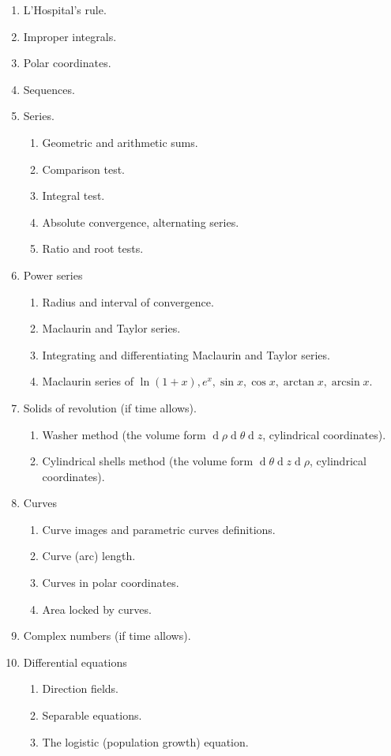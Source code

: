 \documentclass{article}
\begin{document}
\begin{enumerate}
\begin{enumerate}
\end{enumerate}
\item L'Hospital's rule.
\item Improper integrals.
\item Polar coordinates.
\item Sequences.
\item Series.
\begin{enumerate}
\item Geometric and arithmetic sums.
\item Comparison test.
\item Integral test.
\item Absolute convergence, alternating series.
\item Ratio and root tests.
\end{enumerate}
\item Power series
\begin{enumerate}
\item Radius and interval of convergence.
\item Maclaurin and Taylor series.
\item Integrating and differentiating Maclaurin and Taylor series. 
\item Maclaurin series of $\ln(1+x), e^x, \sin x, \cos x, \arctan x, \arcsin x$.
\end{enumerate}
\item Solids of revolution (if time allows).
\begin{enumerate}
\item Washer method (the volume form $\operatorname{d}\rho \operatorname{d}\theta \operatorname{d} z$, cylindrical coordinates).
\item Cylindrical shells method (the volume form $ \operatorname{d}\theta \operatorname{d} z \operatorname{d}\rho$, cylindrical coordinates).
\end{enumerate}
\item Curves
\begin{enumerate}
\item Curve images and parametric curves definitions.
\item Curve (arc) length.
\item Curves in polar coordinates.
\item Area locked by curves.
\end{enumerate}
\item Complex numbers (if time allows).
\item Differential equations
\begin{enumerate}
\item Direction fields.
\item Separable equations.
\item The logistic (population growth) equation.
\end{enumerate}

\end{enumerate}
\end{document}
